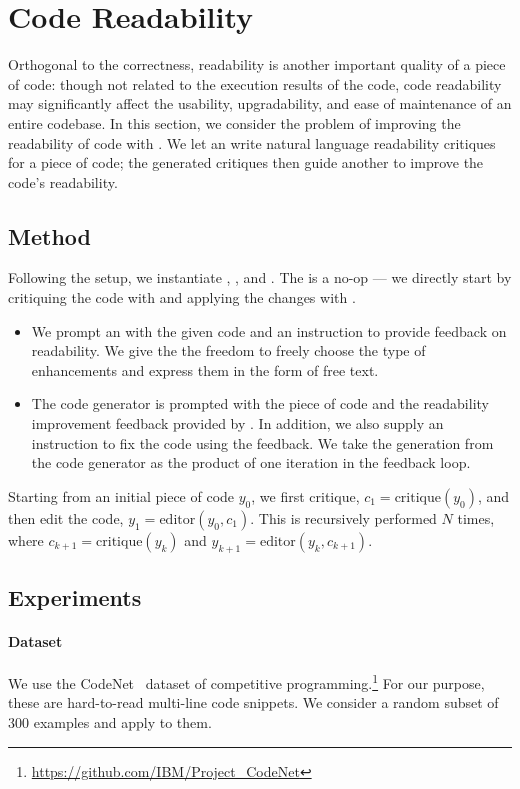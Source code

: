 \section{Code Readability}\label{section:code}
Orthogonal to the correctness, readability is another important quality of a piece of code: though not related to the execution results of the code, code readability may significantly affect the usability, upgradability, and ease of maintenance of an entire codebase. 
In this section, we consider the problem of improving the readability of code with \ours. 
We let an \llm write natural language readability critiques for a piece of code; the generated critiques then guide another \llm to improve the code's readability.

\subsection{Method}
Following the \ours setup, we instantiate \initmod, \fbmod, and \itermod.
The \initmod is a no-op --- we directly start by critiquing the code with \fbmod and applying the changes with \itermod.
\begin{itemize}
\item \textbf{\fbmod} We prompt an \llm with the given code and an instruction to provide feedback on readability.
We give the \llm the freedom to freely choose the type of enhancements and express them in the form of free text.
\item \textbf{\itermod} The code generator \llm is prompted with the piece of code and the readability improvement feedback provided by \fbmod. In addition, we also supply an instruction to fix the code using the feedback. We take the generation from the code generator as the product of one iteration in the feedback loop.
\end{itemize}
Starting from an initial piece of code $y_0$, we first critique, $c_1 = \text{critique}(y_0)$, and then edit the code, $y_1 = \text{editor}(y_0, c_1)$. This is recursively performed $N$ times, where $c_{k+1} = \text{critique}(y_k)$ and $y_{k+1} = \text{editor}(y_k, c_{k+1})$.
\subsection{Experiments}
\paragraph{Dataset} We use the CodeNet~\cite{puri2021codenet} dataset of competitive programming.\footnote{\url{https://github.com/IBM/Project_CodeNet}}
For our purpose, these are hard-to-read multi-line code snippets. We consider a random subset of 300 examples and apply \ours to them.

